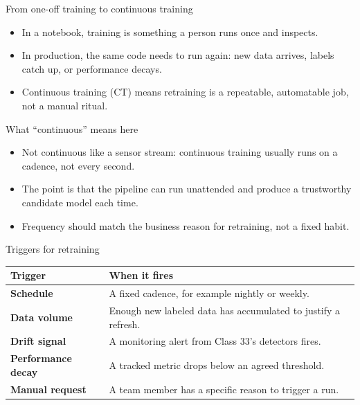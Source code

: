 \begin{frame}{From one-off training to continuous training}
\begin{itemize}
\item In a notebook, training is something a person runs once and inspects.
\item In production, the same code needs to run again: new data arrives, labels catch up, or performance decays.
\item Continuous training (CT) means retraining is a repeatable, automatable job, not a manual ritual.
\end{itemize}
\coursefooter
\end{frame}

\begin{frame}{What ``continuous'' means here}
\begin{itemize}
\item Not continuous like a sensor stream: continuous training usually runs on a cadence, not every second.
\item The point is that the pipeline can run unattended and produce a trustworthy candidate model each time.
\item Frequency should match the business reason for retraining, not a fixed habit.
\end{itemize}
\coursefooter
\end{frame}

\begin{frame}{Triggers for retraining}
\begin{tabularx}{\textwidth}{>{\bfseries}l X}
Trigger & When it fires \\
\toprule
Schedule & A fixed cadence, for example nightly or weekly. \\
Data volume & Enough new labeled data has accumulated to justify a refresh. \\
Drift signal & A monitoring alert from Class 33's detectors fires. \\
Performance decay & A tracked metric drops below an agreed threshold. \\
Manual request & A team member has a specific reason to trigger a run. \\
\bottomrule
\end{tabularx}
\coursefooter
\end{frame}

